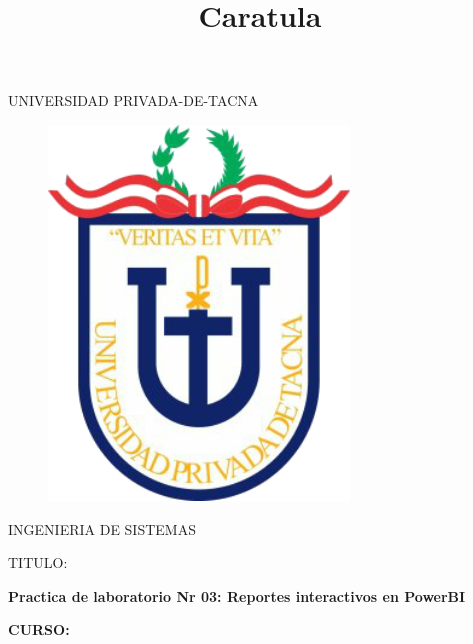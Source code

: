 \documentclass[12pt,letterpaper]{article}
\begin{document}
%


\title{Caratula}

\begin{titlepage}
\begin{center}
\large{UNIVERSIDAD PRIVADA-DE-TACNA}\\
\vspace*{-0.025in}
\begin{figure}[htb]
\begin{center}
\includegraphics[width=8cm]{./Imagenes/logo}
\end{center}
\end{figure}
\vspace*{0.15in}
INGENIERIA DE SISTEMAS  \\

\vspace*{0.5in}
\begin{large}
TITULO:\\
\end{large}

\vspace*{0.1in}
\begin{Large}
\textbf{Practica de laboratorio Nr 03: Reportes interactivos en PowerBI} \\
\end{Large}

\vspace*{0.3in}
\begin{Large}
\textbf{CURSO:} \\
\end{Large}


\end{center}
\end{titlepage}
\end{document}

